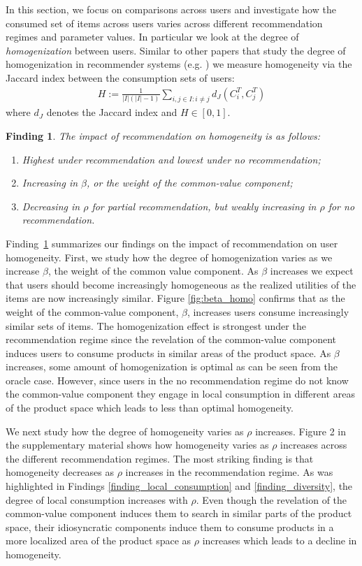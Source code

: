 \documentclass[format=acmsmall, review=false]{acmart}
\newtheorem{finding}{Finding}
\begin{document}
In this section, we focus on comparisons across users and investigate how the consumed set of items across users varies across different recommendation regimes and parameter values. In particular we look at the degree of \textit{homogenization} between users. Similar to other papers that study the degree of homogenization in recommender systems (e.g. \cite{chaney2018algorithmic}) we measure homogeneity via the Jaccard index between the consumption sets of users:
\begin{align*}
H:=\frac{1}{|I|(|I|-1)}\sum_{i,j \in I: i \ne j}d_J(C_i^T,C_j^T)
\end{align*}
where $d_J$ denotes the Jaccard index and $H \in [0,1]$.
\begin{finding}\label{finding_homogeneity}
The impact of recommendation on homogeneity is as follows:
\begin{enumerate}
\item Highest under recommendation and lowest under no recommendation;
\item Increasing in $\beta$, or the weight of the common-value component;
\item Decreasing in $\rho$ for partial recommendation, but weakly increasing in $\rho$ for no recommendation.
\end{enumerate}
\end{finding}
Finding~\ref{finding_homogeneity} summarizes our findings on the impact of recommendation on user homogeneity. First, we study how the degree of homogenization varies as we increase $\beta$, the weight of the common value component. As $\beta$ increases we expect that users should become increasingly homogeneous as the realized utilities of the items are now increasingly similar. Figure \ref{fig:beta_homo} confirms that as the weight of the common-value component, $\beta$, increases users consume increasingly similar sets of items. The homogenization effect is strongest under the recommendation regime since the revelation of the common-value component induces users to consume products in similar areas of the product space. As $\beta$ increases, some amount of homogenization is optimal as can be seen from the oracle case. However, since users in the no recommendation regime do not know the common-value component they engage in local consumption in different areas of the product space which leads to less than optimal homogeneity.
\par
We next study how the degree of homogeneity varies as $\rho$ increases. Figure 2 in the supplementary material shows how homogeneity varies as $\rho$ increases across the different recommendation regimes. The most striking finding is that homogeneity decreases as $\rho$ increases in the recommendation regime. As was highlighted in Findings \ref{finding_local_consumption} and \ref{finding_diversity}, the degree of local consumption increases with $\rho$. Even though the revelation of the common-value component induces them to search in similar parts of the product space, their idiosyncratic components induce them to consume products in a more localized area of the product space as $\rho$ increases which leads to a decline in homogeneity.
\end{document}
